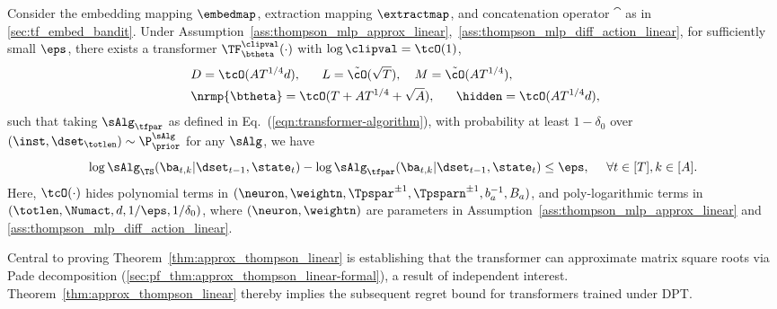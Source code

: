 \documentclass[10pt]{article}
\begin{document}
\begin{theorem}\label{thm:approx_thompson_linear}
Consider the embedding mapping $\embedmap$, extraction mapping $\extractmap$, and concatenation operator $\cat$ as in \ref{sec:tf_embed_bandit}.
Under Assumption~\ref{ass:thompson_mlp_approx_linear},~\ref{ass:thompson_mlp_diff_action_linear}, for sufficiently small $\eps$, there exists a transformer $\TF_\btheta^{\clipval}(\cdot)$ with $\log \clipval = \tcO(1)$,
\begin{equation}\label{eq:ts_tf_param-main}
\begin{aligned}
&~D = \tcO(AT^{1/4}d),~~~~~ L=\tilde \cO(\sqrt{T}),~~~M =\tilde \cO(A T^{1/4}), \\
&~\nrmp{\btheta} = \tcO(T+A T^{1/4}+\sqrt{A}),~~~~~ \hidden = \tcO(A T^{1/4}d),
\end{aligned}
\end{equation}
such that taking $\sAlg_{\tfpar}$ as defined in Eq.~(\ref{eqn:transformer-algorithm}), with probability at least $1-\delta_0$ over $(\inst, \dset_{\totlen}) \sim \P_{\prior}^{\sAlg}$ for any $\sAlg$, we have
\[
 \log \sAlg_{\TS}(\ba_{t,k}|\dset_{t-1},\state_t) - \log \sAlg_{\tfpar}(\ba_{t,k}|\dset_{t-1},\state_t) \leq \eps,~~~~\forall t\in[T],k\in[A].
\]
Here, $\tcO(\cdot)$ hides polynomial terms in $(\neuron,\weightn, \Tpspar^{\pm1}, \Tpsparn^{\pm1}, b_a^{-1}, B_a)$, and poly-logarithmic terms in $(\totlen, \Numact, d, 1/\eps,\\ 1/\delta_0)$, where $(\neuron, \weightn)$ are parameters in Assumption~\ref{ass:thompson_mlp_approx_linear} and \ref{ass:thompson_mlp_diff_action_linear}.
\end{theorem}

Central to proving Theorem~\ref{thm:approx_thompson_linear} is establishing that the transformer can approximate matrix square roots via Pade decomposition (\cref{sec:pf_thm:approx_thompson_linear-formal}), a result of independent interest. Theorem~\ref{thm:approx_thompson_linear} thereby implies the subsequent regret bound for transformers trained under DPT.
\end{document}
